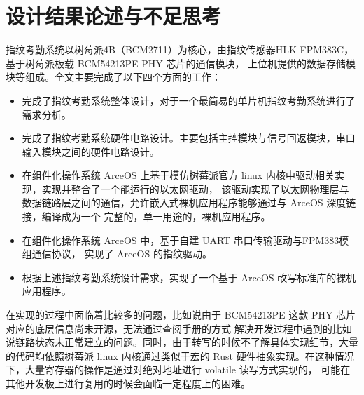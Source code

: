 \section{设计结果论述与不足思考}

    指纹考勤系统以树莓派4B（BCM2711）为核心，由指纹传感器HLK-FPM383C，基于树莓派板载 BCM54213PE PHY 芯片的通信模块，
    上位机提供的数据存储模块等组成。全文主要完成了以下四个方面的工作：

    \begin{itemize}
        \item 完成了指纹考勤系统整体设计，对于一个最简易的单片机指纹考勤系统进行了需求分析。
        \item 完成了指纹考勤系统硬件电路设计。主要包括主控模块与信号回返模块，串口输入模块之间的硬件电路设计。
        \item 在组件化操作系统 ArceOS 上基于模仿树莓派官方 linux 内核中驱动相关实现，实现并整合了一个能运行的以太网驱动，
            该驱动实现了以太网物理层与数据链路层之间的通信，允许嵌入式裸机应用程序能够通过与 ArceOS 深度链接，编译成为一个
            完整的，单一用途的，裸机应用程序。
        \item 在组件化操作系统 ArceOS 中，基于自建 UART 串口传输驱动与FPM383模组通信协议\cite{noauthor_fpm383c_nodate}，
            实现了 ArceOS 的指纹驱动。
        \item 根据上述指纹考勤系统设计需求，实现了一个基于 ArceOS 改写标准库的裸机应用程序。
    \end{itemize}

    在实现的过程中面临着比较多的问题，比如说由于 BCM54213PE 这款 PHY 芯片对应的底层信息尚未开源，无法通过查阅手册的方式
    解决开发过程中遇到的比如说链路状态未正常建立的问题。同时，由于转写的时候不了解具体实现细节，大量的代码均依照树莓派 linux
    内核通过类似于宏的 Rust 硬件抽象实现。在这种情况下，大量寄存器的操作是通过对绝对地址进行 volatile 读写方式实现的，
    可能在其他开发板上进行复用的时候会面临一定程度上的困难。


